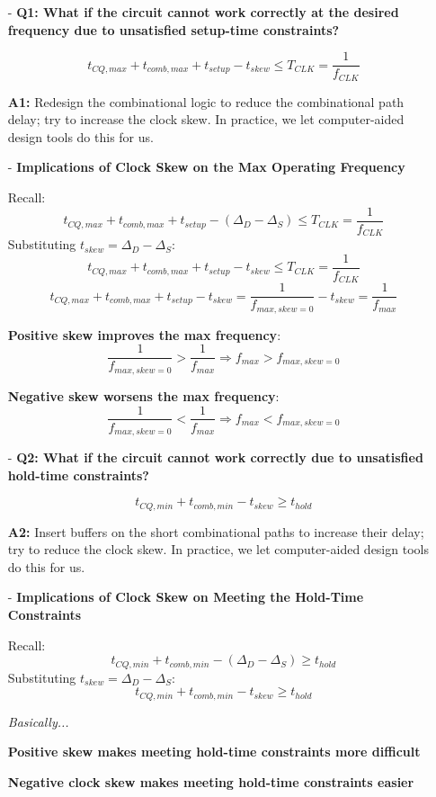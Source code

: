 \documentclass[12pt,openany]{book}
\begin{document}
\begin{itemize}
    \item[-] \textbf{Q1: What if the circuit cannot work correctly at the desired frequency due to unsatisfied setup-time constraints?}
    
    \[
    t_{CQ,max} + t_{comb,max} + t_{setup} - t_{skew} \leq T_{CLK} = \frac{1}{f_{CLK}}
    \]

    \textbf{A1:} Redesign the combinational logic to reduce the combinational path delay; try to increase the clock skew. In practice, we let computer-aided design tools do this for us.
    
    \item[-] \textbf{Implications of Clock Skew on the Max Operating Frequency}
    
    Recall:
    \[
    t_{CQ,max} + t_{comb,max} + t_{setup} - (\Delta_D - \Delta_S) \leq T_{CLK} = \frac{1}{f_{CLK}}
    \]
    Substituting $t_{skew} = \Delta_D - \Delta_S$:
    \[
    t_{CQ,max} + t_{comb,max} + t_{setup} - t_{skew} \leq T_{CLK} = \frac{1}{f_{CLK}}
    \]
    \[
    t_{CQ,max} + t_{comb,max} + t_{setup} - t_{skew} = \frac{1}{f_{max,skew=0}} - t_{skew} = \frac{1}{f_{max}}
    \]

    \textbf{Positive skew improves the max frequency}:
    \[
    \frac{1}{f_{max,skew=0}} > \frac{1}{f_{max}} \Rightarrow f_{max} > f_{max,skew=0}
    \]

    \textbf{Negative skew worsens the max frequency}:
    \[
    \frac{1}{f_{max,skew=0}} < \frac{1}{f_{max}} \Rightarrow f_{max} < f_{max,skew=0}
    \]

    \item[-] \textbf{Q2: What if the circuit cannot work correctly due to unsatisfied hold-time constraints?}

    \[
    t_{CQ,min} + t_{comb,min} - t_{skew} \geq t_{hold}
    \]

    \textbf{A2:} Insert buffers on the short combinational paths to increase their delay; try to reduce the clock skew. In practice, we let computer-aided design tools do this for us.

    \item[-] \textbf{Implications of Clock Skew on Meeting the Hold-Time Constraints}

    Recall:
    \[
    t_{CQ,min} + t_{comb,min} - (\Delta_D - \Delta_S) \geq t_{hold}
    \]
    Substituting $t_{skew} = \Delta_D - \Delta_S$:
    \[
    t_{CQ,min} + t_{comb,min} - t_{skew} \geq t_{hold}
    \]

	\textit{Basically...}\newline

    \textbf{Positive skew makes meeting hold-time constraints more difficult}

    \textbf{Negative clock skew makes meeting hold-time constraints easier}
\end{itemize}
\end{document}
